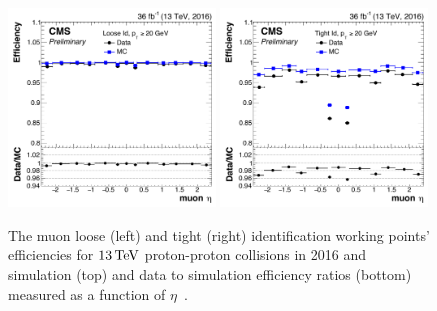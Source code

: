 \begin{figure}[!ht]
\centering
 \includegraphics[width=0.49\textwidth]{figs/background-estimation/simulationCorrections/looseMuonIdEff_2016.pdf}
\includegraphics[width=0.49\textwidth]{figs/background-estimation/simulationCorrections/tightMuonIdEff_2016.pdf}
\caption{
The muon loose (left) and tight (right) identification working points' efficiencies for $13\,\text{Te\hspace{-.08em}V}$ proton-proton collisions in 2016 and simulation (top) and data to simulation efficiency ratios (bottom) measured as a function of $\eta$~\cite{CMS-DP-2017-007}.
}
\label{fig:tightMuonIdEff}
\end{figure}

